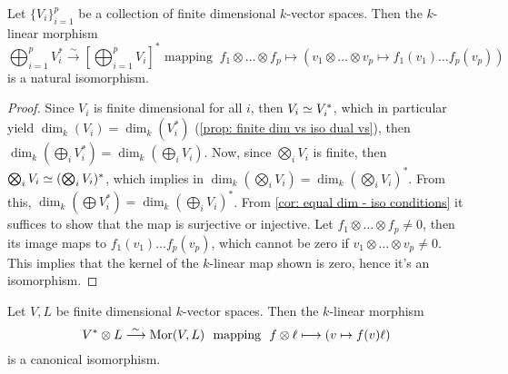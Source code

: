 \begin{proposition}\label{prop: dual tensor isomorphism}
    Let \(\{V_i\}_{i=1}^p\) be a collection of finite dimensional \(k\)-vector
    spaces. Then the \(k\)-linear morphism
    \[
        \bigoplus_{i=1}^p V_i^* \overset{\sim}\longrightarrow \left[ \bigoplus_{i=1}^p V_i \right]^*
        \text{ mapping }\
        f_1 \otimes \dots \otimes f_p \longmapsto (v_1 \otimes \dots \otimes v_p \mapsto
        f_1(v_1) \dots f_p(v_p))
    \]
    is a natural isomorphism.
\end{proposition}

\begin{proof}
    Since \(V_i\) is finite dimensional for all \(i\), then \(V_i \simeq V_i^*\),
    which in particular yield \(\dim_k(V_i) = \dim_k(V_i^*)\) (\cref{prop: finite
        dim vs iso dual vs}), then \(\dim_k(\bigoplus_i V_i^*) = \dim_k(\bigoplus_i
    V_i)\). Now, since \(\bigotimes_i V_i\) is finite, then \(\bigotimes_i V_i
    \simeq (\bigotimes_i V_i)^*\), which implies in \(\dim_k(\bigotimes_i V_i) =
    \dim_k(\bigotimes_i V_i)^*\). From this, \(\dim_k(\bigoplus V_i^*) =
    \dim_k(\bigoplus_i V_i)^*\). From \cref{cor: equal dim - iso conditions} it
    suffices to show that the map is surjective or injective. Let \(f_1 \otimes
    \dots \otimes f_p \neq 0\), then its image maps to \(f_1(v_1) \dots
    f_p(v_p)\), which cannot be zero if \(v_1 \otimes \dots \otimes v_p \neq 0\).
    This implies that the kernel of the \(k\)-linear map shown is zero, hence it's
    an isomorphism.
\end{proof}

\begin{proposition}\label{prop: tensor with dual iso hom}
    Let \(V, L\) be finite dimensional \(k\)-vector spaces. Then the \(k\)-linear
    morphism
    \[
        V^* \otimes L \overset{\sim}\longrightarrow \operatorname{Mor}(V, L)\ \text{ mapping }\ f \otimes \ell \longmapsto (v \mapsto f(v)\ell)
    \]
    is a canonical isomorphism.
\end{proposition}

